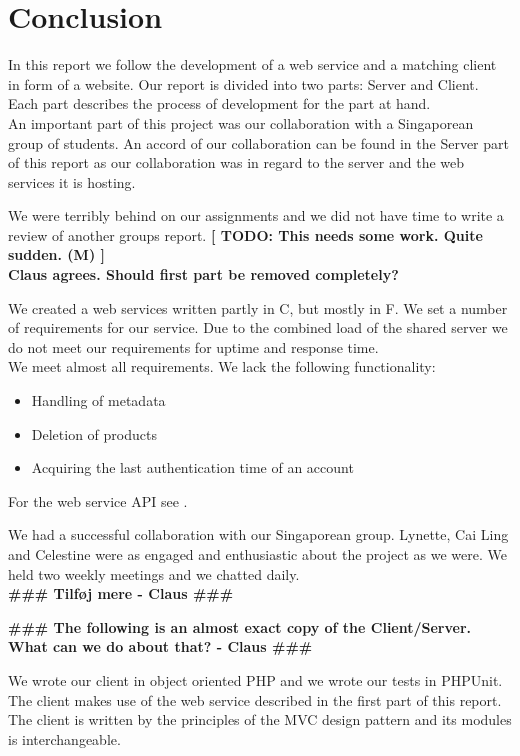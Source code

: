 \section{Conclusion}
In this report we follow the development of a web service and a matching client in form of a website. Our report is divided into two parts: Server and Client. Each part describes the process of development for the part at hand.
\\An important part of this project was our collaboration with a Singaporean group of students. An accord of our collaboration can be found in the Server part of this report as our collaboration was in regard to the server and the web services it is hosting.

We were terribly behind on our assignments and we did not have time to write a review of another groups report. \textbf{[ TODO: This needs some work. Quite sudden. (M) ]}
\\\textbf{Claus agrees. Should first part be removed completely?}

We created a web services written partly in C\Sh, but mostly in F\Sh. We set a number of requirements for our service. Due to the combined load of the shared server we do not meet our requirements for uptime and response time.
\\We meet almost all requirements. We lack the following functionality:
\begin{itemize}
\item Handling of metadata
\item Deletion of products
\item Acquiring the last authentication time of an account
\end{itemize}
\mbox{}For the web service API see .

We had a successful collaboration with our Singaporean group. Lynette, Cai Ling and Celestine were as engaged and enthusiastic about the project as we were. We held two weekly meetings and we chatted daily.
\\\textbf{\#\#\# Tilføj mere - Claus \#\#\#}

\textbf{\#\#\# The following is an almost exact copy of the Client/Server. What can we do about that? - Claus \#\#\#}

We wrote our client in object oriented PHP and we wrote our tests in PHPUnit. The client makes use of the web service described in the first part of this report. The client is written by the principles of the MVC design pattern and its modules is interchangeable.

